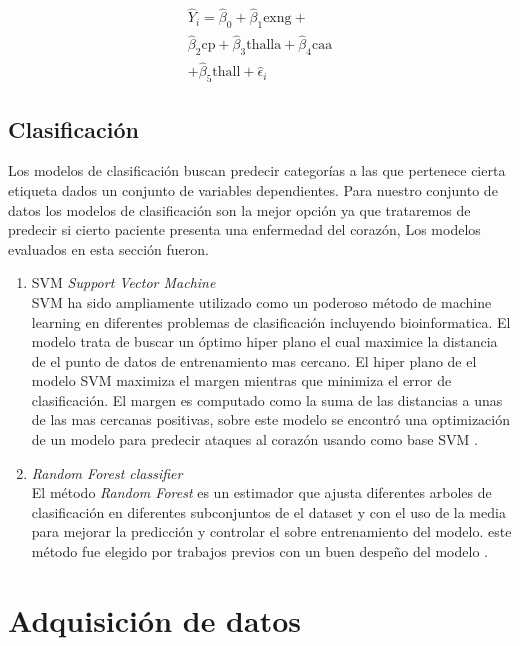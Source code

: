 \documentclass[10pt,journal]{IEEEtran}
\begin{document}
\begin{multline}
\hat{Y}_i = \hat{\beta}_0 + \hat{\beta}_1 \text{exng}  + \\ \hat{\beta}_2 \text{cp}  + \hat{\beta}_3 \text{thalla}  +  \hat{\beta}_4 \text{caa} \\ + \hat{\beta}_5 \text{thall} +  \hat{\epsilon}_i
\end{multline}


\subsection{Clasificación}
Los modelos de clasificación buscan predecir categorías a las que pertenece cierta etiqueta dados un conjunto de variables dependientes.
Para nuestro conjunto de datos los modelos de clasificación son la mejor opción ya que trataremos de predecir si cierto paciente presenta una enfermedad del corazón, Los modelos evaluados en esta sección fueron.

\begin{enumerate}
  \item SVM \emph{Support Vector Machine} \\
  SVM ha sido ampliamente utilizado como un poderoso método de machine learning en diferentes problemas de clasificación incluyendo bioinformatica. El modelo trata de buscar un óptimo hiper plano el cual maximice la distancia de el punto de datos de entrenamiento mas cercano. El hiper plano de el modelo SVM maximiza el margen mientras que minimiza el error de clasificación. El margen es computado como la suma de las distancias a unas de las mas cercanas positivas, sobre este modelo se encontró una optimización de un modelo para predecir ataques al corazón usando como base SVM \cite{8684835}.
  \item \emph{Random Forest classifier} \\
       El método \emph{Random Forest} es un estimador que ajusta diferentes arboles de clasificación en diferentes subconjuntos de el dataset y con el uso de la media para mejorar la predicción y controlar el sobre entrenamiento del modelo. este método fue elegido por trabajos previos con un buen despeño del modelo \cite{Pal_2021}.   
\end{enumerate}


\section{Adquisición de datos}
\label{sec:adquisiciondatos}
\end{document}
